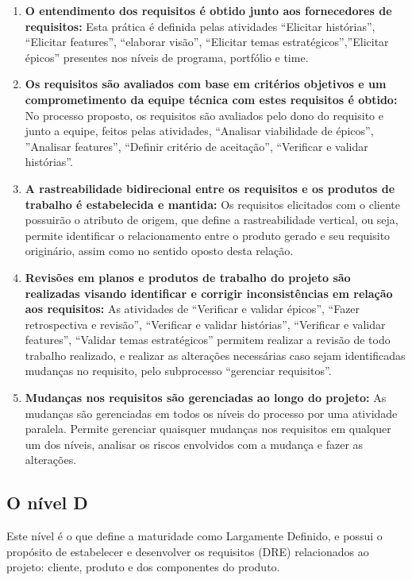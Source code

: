 \begin{enumerate}
\item \textbf{O entendimento dos requisitos é obtido junto aos fornecedores de requisitos:} Esta prática é definida pelas atividades “Elicitar histórias”, “Elicitar features”, “elaborar visão”, “Elicitar temas estratégicos”,”Elicitar épicos” presentes nos níveis de programa, portfólio e time.
\item \textbf{Os requisitos são avaliados com base em critérios objetivos e um comprometimento da equipe técnica com estes requisitos é obtido:} No processo proposto, os requisitos são avaliados pelo dono do requisito e junto a equipe, feitos pelas atividades, “Analisar viabilidade de épicos”, ”Analisar features”, “Definir critério de aceitação”, “Verificar e validar histórias”.
\item \textbf{A rastreabilidade bidirecional entre os requisitos e os produtos de trabalho é estabelecida e mantida:} Os requisitos elicitados com o cliente possuirão o atributo de origem, que define a rastreabilidade vertical, ou seja, permite identificar o relacionamento entre o produto gerado e seu requisito originário, assim como no sentido oposto desta relação.
\item \textbf{Revisões em planos e produtos de trabalho do projeto são realizadas visando identificar e corrigir inconsistências em relação aos requisitos:} As atividades de “Verificar e validar épicos”, “Fazer retrospectiva e revisão”, “Verificar e validar histórias”, “Verificar e validar features”, “Validar temas estratégicos” permitem realizar a revisão de todo trabalho realizado, e realizar as alterações necessárias caso sejam identificadas mudanças no requisito, pelo subprocesso “gerenciar requisitos”.
\item \textbf{Mudanças nos requisitos são gerenciadas ao longo do projeto:} As mudanças são gerenciadas em todos os níveis do processo por uma atividade paralela. Permite gerenciar quaisquer mudanças nos requisitos em qualquer um dos níveis, analisar os riscos envolvidos com a mudança e fazer as alterações.
\end{enumerate}

\subsection{O nível D}

Este nível é o que define a maturidade como Largamente Definido, e possui o propósito de estabelecer e desenvolver os requisitos (DRE) relacionados ao projeto: cliente, produto e dos componentes do produto.

